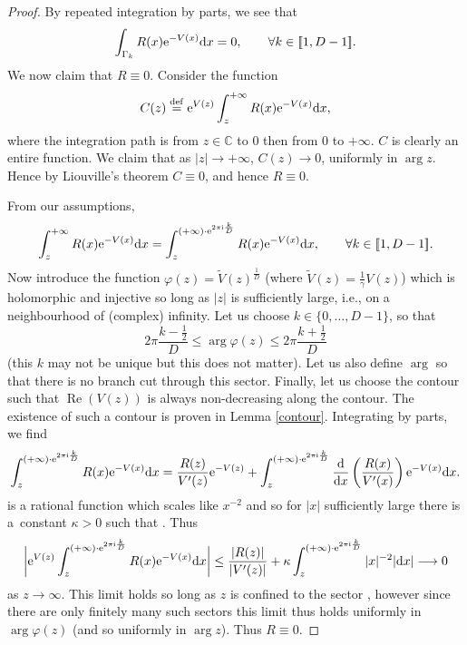 \begin{proof}
By repeated integration by parts, we see that
\begin{align*}
\int_{\Gamma_k} R(x) {\rm e}^{-V(x)} {\rm d}x = 0,\qquad \forall k \in [\![ 1,D-1]\!].
\end{align*}
We now claim that $R \equiv 0$. Consider the function
\begin{equation*}
C(z) \overset{\mathrm{def}}{=} {\rm e}^{V(z)}\int_z^{+\infty} R(x) {\rm e}^{-V(x)} {\rm d}x,
\end{equation*}
where the integration path is from $z \in \mathbb{C}$ to $0$ then from $0$ to $+\infty$. $C$ is clearly an entire function. We claim that as $|z| \to +\infty$, $C(z) \to 0$, uniformly in $\operatorname{arg} z $. Hence by Liouville's theorem $C \equiv 0$, and hence $R \equiv 0$.

From our assumptions,
\begin{align*}
\int_z^{+\infty} R(x) {\rm e}^{-V(x)} {\rm d}x = \int_z^{(+\infty) \cdot {\rm e}^{2\pi {\rm i} \frac{k}{D}}} R(x) {\rm e}^{-V(x)} {\rm d}x,\qquad \forall k \in [\![ 1,D-1]\!].
\end{align*}
Now introduce the function $\varphi(z) = \tilde{V}(z)^\frac{1}{D}$ \big(where $\tilde{V}(z) = \frac{1}{\gamma}V(z)$\big) which is holomorphic and injective so long as $|z|$ is sufficiently large, i.e., on a neighbourhood of (complex) infinity. Let us choose $k \in \{0, \dots, D-1\}$, so that
\[
 2\pi \frac{k-\frac{1}{2}}{D} \leq \arg \varphi(z) \leq 2\pi \frac{k+\frac{1}{2}}{D}
\]
 (this $k$ may not be unique but this does not matter). Let us also define $\arg$ so that there is no branch cut through this sector. Finally, let us choose the contour such that $\operatorname{Re} (V(z))$ is always non-decreasing along the contour. The existence of such a contour is proven in Lemma \ref{contour}. Integrating by parts, we find
\begin{align*}
\int_z^{(+\infty) \cdot {\rm e}^{2\pi {\rm i} \frac{k}{D}}} R(x) {\rm e}^{-V(x)} {\rm d}x = \frac{R(z)}{V^\prime(z)} {\rm e}^{-V(z)}+ \int_z^{(+\infty) \cdot {\rm e}^{2\pi {\rm i} \frac{k}{D}}} \frac{\rm d}{{\rm d}x}\left( \frac{R(x)}{V^\prime(x)} \right) {\rm e}^{-V(x)} {\rm d}x.
\end{align*}
 is a rational function which scales like $x^{-2}$ and so for $|x|$ sufficiently large there is a~constant $\kappa>0$ such that . Thus
\begin{equation*}
\bigg|{\rm e}^{V(z)} \int_z^{(+\infty) \cdot {\rm e}^{2\pi {\rm i} \frac{k}{D}}} R(x) {\rm e}^{-V(x)} {\rm d}x\bigg| \leq \frac{|R(z)|}{|V^\prime(z)|}+ \kappa\int_z^{(+\infty) \cdot {\rm e}^{2\pi {\rm i} \frac{k}{D}}}|x|^{-2} |{\rm d}x| \longrightarrow 0
\end{equation*}
as $z \to \infty$. This limit holds so long as $z$ is confined to the sector , however since there are only finitely many such sectors this limit thus holds uniformly in $\operatorname{arg} \varphi(z)$ (and so uniformly in $\operatorname{arg} z$). Thus $R \equiv 0$.


\end{proof}
